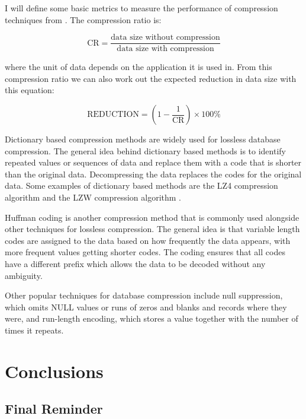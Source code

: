 \documentclass[logo,bsc,singlespacing,parskip,online]{infthesis}
\begin{document}
I will define some basic metrics to measure the performance of compression techniques from \citep{DBLP:journals/sigmod/RothH93}. The compression ratio is:

\begin{equation}
\mathrm{CR} = \frac{\text{data  size without compression}}{\text{data size with compression}}
\end{equation}

where the unit of data depends on the application it is used in. From this compression ratio we can also work out the expected reduction in data size with this equation:

\begin{equation}
\mathrm{REDUCTION} = (1 - \frac{1}{\text{CR}}) \times 100\%
\end{equation}

Dictionary based compression methods are widely used for lossless database compression. The general idea behind dictionary based methods is to identify repeated values or sequences of data and replace them with a code that is shorter than the original data. Decompressing the data replaces the codes for the original data. Some examples of dictionary based methods are the LZ4 compression algorithm \citep{collet-lz4} and the LZW compression algorithm \citep{DBLP:journals/computer/Welch84}.

Huffman coding \citep{huffman1952method} is another compression method that is commonly used alongside other techniques for lossless compression. The general idea is that variable length codes are assigned to the data based on how frequently the data appears, with more frequent values getting shorter codes. The coding ensures that all codes have a different prefix which allows the data to be decoded without any ambiguity.

Other popular techniques for database compression include null
suppression, which omits NULL values or runs of zeros and blanks and records where they were, and run-length encoding, which stores a value together with the number of times it repeats.

\chapter{Conclusions}

\section{Final Reminder}
\end{document}
